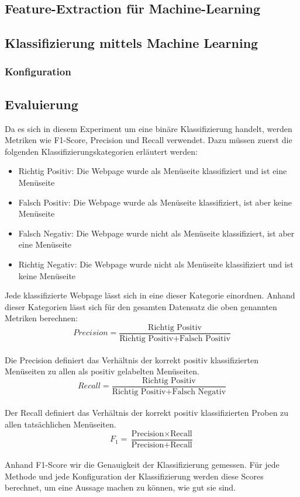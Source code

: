 \subsection{Feature-Extraction für Machine-Learning}
\subsection{Klassifizierung mittels Machine Learning}
\subsubsection{Konfiguration}
\subsubsection{}
\subsection{Evaluierung}
Da es sich in diesem Experiment um eine binäre Klassifizierung handelt, werden Metriken wie F1-Score, Precision und Recall verwendet.
Dazu müssen zuerst die folgenden Klassifizierungskategorien erläutert werden:
\begin{itemize}
	\item Richtig Positiv: Die Webpage wurde als Menüseite klassifiziert und ist eine Menüseite
	\item Falsch Positiv: Die Webpage wurde als Menüseite klassifiziert, ist aber keine Menüseite
	\item Falsch Negativ: Die Webpage wurde nicht als Menüseite klassifiziert, ist aber eine Menüseite
	\item Richtig Negativ: Die Webpage wurde nicht als Menüseite klassifiziert und ist keine Menüseite
\end{itemize}
Jede klassifizierte Webpage lässt sich in eine dieser Kategorie einordnen.
Anhand dieser Kategorien lässt sich für den gesamten Datensatz die oben genannten Metriken berechnen:\\
\[Precision=\frac{\text{Richtig Positiv}}{\text{Richtig Positiv} + \text{Falsch Positiv}}\]\\
Die Precision definiert das Verhältnis der korrekt positiv klassifizierten Menüseiten zu allen als positiv gelabelten Menüseiten.\\
\[Recall=\frac{\text{Richtig Positiv}}{\text{Richtig Positiv} + \text{Falsch Negativ}}\]\\
Der Recall definiert das Verhältnis der korrekt positiv klassifizierten Proben zu allen tatsächlichen Menüseiten.\\
\[F_{1}=\frac{\text{Precision} \times \text{Recall}}{\text{Precision} + \text{Recall}}\]\\
Anhand F1-Score wir die Genauigkeit der Klassifizierung gemessen.
Für jede Methode und jede Konfiguration der Klassifizierung werden diese Scores berechnet, um eine Aussage machen zu können, wie gut sie sind.
